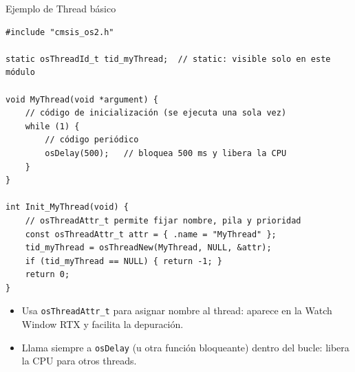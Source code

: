 \begin{frame}[fragile]{Ejemplo de Thread básico}
    \begin{verbatim}
#include "cmsis_os2.h"

static osThreadId_t tid_myThread;  // static: visible solo en este módulo

void MyThread(void *argument) {
    // código de inicialización (se ejecuta una sola vez)
    while (1) {
        // código periódico
        osDelay(500);   // bloquea 500 ms y libera la CPU
    }
}

int Init_MyThread(void) {
    // osThreadAttr_t permite fijar nombre, pila y prioridad
    const osThreadAttr_t attr = { .name = "MyThread" };
    tid_myThread = osThreadNew(MyThread, NULL, &attr);
    if (tid_myThread == NULL) { return -1; }
    return 0;
}
    \end{verbatim}
    \begin{itemize}
        \item Usa \texttt{osThreadAttr\_t} para asignar nombre al thread:
              aparece en la Watch Window RTX y facilita la depuración.
        \item Llama siempre a \texttt{osDelay} (u otra función bloqueante)
              dentro del bucle: libera la CPU para otros threads.
    \end{itemize}
\end{frame}


